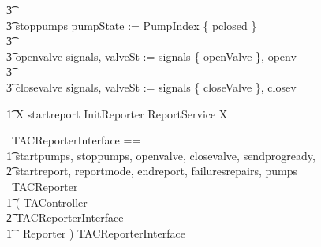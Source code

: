 \documentclass{report} %
\begin{document}
\begin{circusaction}
                    \t3 \extchoice
                    \\ %
                    \t3 stoppumps \then pumpState := PumpIndex \cross \{ pclosed \}
                    \\ %
                    \t3 \extchoice
                    \\ %
                    \t3 openvalve \then signals, valveSt := signals \cup \{ openValve \}, openv 
                    \\ %
                    \t3 \extchoice
                    \\ %
                    \t3 closevalve \then signals, valveSt := signals \cup \{ closeValve \}, closev \\
\end{circusaction}
\begin{circusaction}
        \t1 \circspot \circmu X \circspot startreport \then \lschexpract InitReporter \rschexpract \circseq ReportService \circseq X \\
\end{circusaction}
\begin{circus}
        \circend
\end{circus}

\begin{circus}

   \circchannelset\ TACReporterInterface == \\
        \t1 \lchanset startpumps, stoppumps, openvalve, closevalve, sendprogready, \\
            \t2 startreport, reportmode, endreport, failuresrepairs, pumps \rchanset  \\

   \circprocess\ TACReporter \circdef \\
    \t1 ( TAController \\
        \t2 \lpar TACReporterInterface \rpar \\
        \t1\ \ Reporter ) \circhide TACReporterInterface
\end{circus}
\end{document}
